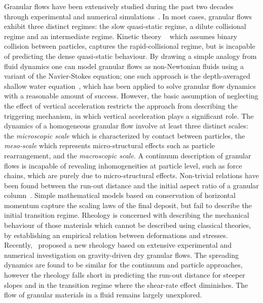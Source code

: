 Granular flows have been extensively studied during the past two decades 
through experimental and numerical simulations~\citep{Jaeger1996}. In most 
cases, granular flows exhibit three distinct regimes: the slow quasi-static 
regime, a dilute collisional regime and an intermediate regime. Kinetic theory 
~\citep{Jenkins1983, Savage1981} which assumes binary collision between 
particles, captures the rapid-collisional regime, but is incapable of 
predicting the dense quasi-static behaviour. By drawing a simple analogy from 
fluid dynamics one can model granular flows as non-Newtonian fluids using a 
variant of the Navier-Stokes equation; one such approach is the depth-averaged 
shallow water equation~\citep{Savage1991}, which has been applied to solve 
granular flow dynamics with a reasonable amount of success. However, the basic 
assumption of neglecting the effect of vertical acceleration restricts the 
approach from describing the triggering mechanism, in which vertical 
acceleration plays a significant role. The dynamics of a homogeneous granular 
flow involve at least three distinct scales: the \textit{microscopic scale} 
which is characterized by contact between particles, the \textit{meso-scale} 
which represents micro-structural effects such as particle rearrangement, and 
the \textit{macroscopic scale}. A continuum description of granular flows is 
incapable of revealing inhomogeneities at particle level, such as force chains, 
which are purely due to micro-structural effects. Non-trivial relations have 
been found between the run-out distance and the initial aspect ratio of a 
granular column~\citep{Staron2007, Lajeunesse2005, Lube2005}. Simple 
mathematical models based on conservation of horizontal momentum capture the 
scaling laws of the final deposit, but fail to describe the initial transition 
regime. Rheology is concerned with describing the mechanical behaviour of those 
materials which cannot be described using classical theories, by establishing 
an empirical relation between deformations and stresses. 
Recently,~\citet{Midi2004} proposed a new rheology based on extensive 
experimental and numerical investigation on gravity-driven dry granular flows. 
The spreading dynamics are found to be similar for the continuum and particle 
approaches, however the rheology falls short in predicting the run-out distance 
for steeper slopes and in the transition regime where the shear-rate effect 
diminishes. The flow of granular materials in a fluid remains largely 
unexplored. 

